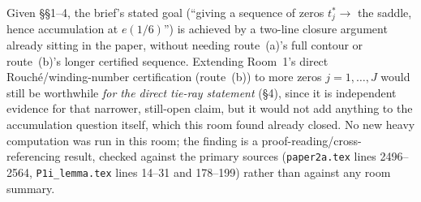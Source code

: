 \documentclass[11pt]{article}
\begin{document}
Given \S\S1--4, the brief's stated goal (``giving a sequence of zeros $t^\ast_j\to$ the saddle,
hence accumulation at $e(1/6)$'') is achieved by a two-line closure argument already sitting in the
paper, without needing route~(a)'s full contour or route~(b)'s longer certified sequence. Extending
Room~1's direct Rouch\'e/winding-number certification (route~(b)) to more zeros $j=1,\ldots,J$ would
still be worthwhile \emph{for the direct tie-ray statement} (\S4), since it is independent evidence
for that narrower, still-open claim, but it would not add anything to the accumulation question
itself, which this room found already closed. No new heavy computation was run in this room; the
finding is a proof-reading/cross-referencing result, checked against the primary sources
(\texttt{paper2a.tex} lines 2496--2564, \texttt{P1i\_lemma.tex} lines 14--31 and 178--199) rather
than against any room summary.
\end{document}
